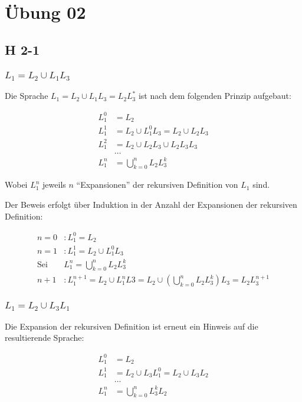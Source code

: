 \documentclass{scrartcl}
\begin{document}
\section{Übung 02}

\subsection{H 2-1}

\subsubsection{$L_1 = L_2 \cup L_1 L_3$}

Die Sprache $L_1 = L_2 \cup L_1 L_3 = L_2 L_3^*$ ist nach dem folgenden Prinzip aufgebaut:

\begin{align*}
L_1^0 &= L_2\\
L_1^1 &= L_2 \cup L_1^0 L_3 = L_2 \cup L_2 L_3\\
L_1^2 &= L_2 \cup L_2 L_3 \cup L_2 L_3 L_3\\
      &\ldots\\
L_1^n &= \bigcup_{k=0}^n L_2 L_3^k
\end{align*}

Wobei $L_1^n$ jeweils $n$ \enquote{Expansionen} der rekursiven Definition von $L_1$ sind.

Der Beweis erfolgt über Induktion in der Anzahl der Expansionen der rekursiven Definition:

\begin{align*}
n = 0&: L_1^0 = L_2\\
n = 1&: L_1^1 = L_2 \cup L_1^0 L_3\\
\text{Sei }& L_1^n = \bigcup_{k = 0}^n L_2 L_3^k\\
n + 1&: L_1^{n+1} = L_2 \cup L_1^n L3 = L_2 \cup (\bigcup_{k = 0}^n L_2 L_3^k) L_3 = L_2 L_3^{n+1}
\end{align*}

\subsubsection{$L_1 = L_2 \cup L_3 L_1$}

Die Expansion der rekursiven Definition ist erneut ein Hinweis auf die resultierende Sprache:

\begin{align*}
L_1^0 &= L_2\\
L_1^1 &= L_2 \cup L_3 L_1^0 = L_2 \cup L_3 L_2\\
      &\ldots\\
L_1^n &= \bigcup_{k=0}^n L_3^k L_2
\end{align*}
\end{document}
